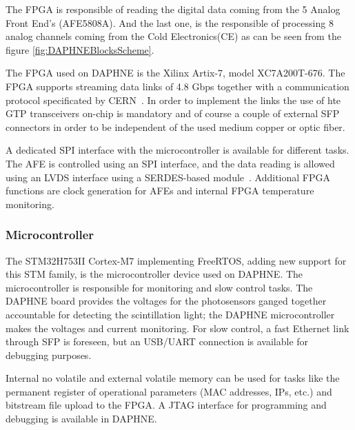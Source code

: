 The FPGA is responsible of reading the digital data coming from the 5 Analog Front End's (AFE5808A). And the last one, is the responsible of processing 8 analog channels coming from the Cold Electronics(CE) as can be seen from the figure \ref{fig:DAPHNEBlocksScheme}.

The FPGA used on DAPHNE is the Xilinx Artix-7, model XC7A200T-676. The FPGA supports streaming data links of 4.8 Gbps together with a communication protocol specificated by CERN~\cite{Borga:2019rwr}. In order to implement the links the use of hte  GTP transceivers on-chip is mandatory and of course a couple of external SFP connectors in order to be independent of the used medium copper or optic fiber. 

A dedicated SPI interface with the microcontroller is available for different tasks. The AFE is controlled using an SPI interface, and the data reading is allowed using an LVDS interface using a SERDES-based module~\cite{IEEE_Ref2:understanding_LVDS}. Additional FPGA functions are clock generation for AFEs and internal FPGA temperature monitoring. 

\subsubsection{Microcontroller}

The STM32H753II Cortex-M7 implementing FreeRTOS, adding new support for this STM family, is the microcontroller device used on DAPHNE. The microcontroller is responsible for monitoring and slow control tasks. The DAPHNE board provides the voltages for the photosensors ganged together accountable for detecting the scintillation light; the DAPHNE microcontroller makes the voltages and current monitoring. For slow control, a fast Ethernet link through SFP is foreseen, but an USB/UART connection is available for debugging purposes.  

Internal no volatile and external volatile memory can be used for tasks like the permanent register of operational parameters (MAC addresses, IPs, etc.) and bitstream file upload to the FPGA. A JTAG interface for programming and debugging is available in DAPHNE.



 
 








